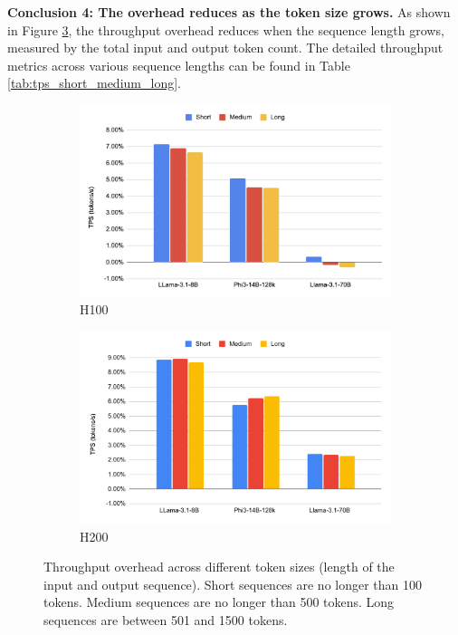 \documentclass{article}
\begin{document}
\noindent\textbf{Conclusion 4: The overhead reduces as the token size grows.} As shown in Figure \ref{fig:tps-overhead-vs-token-size}, the throughput overhead reduces when the sequence length grows, measured by the total input and output token count. The detailed throughput metrics across various sequence lengths can be found in Table \ref{tab:tps_short_medium_long}.

\begin{figure}
    \centering
    \begin{subfigure}[b]{0.49\linewidth}
        \centering
        \includegraphics[width=\linewidth]{outputs/h100/tps-vs-token-size.png}
        \caption{H100}
        \label{fig:tps-overhead-vs-token-size-h100}
    \end{subfigure}
    \begin{subfigure}[b]{0.49\linewidth}
        \centering
        \includegraphics[width=\linewidth]{outputs/h200_1c/tps-vs-token-size.pdf}
        \caption{H200}
        \label{fig:tps-overhead-vs-token-size-h200}
    \end{subfigure}
    \caption{Throughput overhead across different token sizes (length of the input and output sequence). Short sequences are no longer than 100 tokens. Medium sequences are no longer than 500 tokens. Long sequences are between 501 and 1500 tokens.}
    \label{fig:tps-overhead-vs-token-size}
\end{figure}
\end{document}
